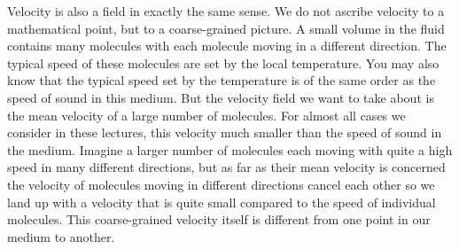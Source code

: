 Velocity is also a field in exactly the same sense. We do not ascribe velocity to a
mathematical point, but to a coarse-grained picture. A small volume in
the fluid contains many molecules with each molecule moving in a different direction.
 The typical speed of these molecules are set by the local temperature.
You may also know that the typical speed set by the temperature is of the
same order as the speed of sound in this medium. 
But the velocity field we want to take about is the mean velocity of a 
large number of molecules. 
For almost all cases we consider in these lectures, 
this velocity much smaller than the speed of sound in the medium. 
Imagine a larger number of molecules each moving with quite a high
speed in many different directions, but as far as their mean velocity is 
concerned the velocity of molecules moving in different directions cancel
each other so we land up with a velocity that is quite small compared to the
speed of individual molecules. This coarse-grained velocity itself is different
from one point in our medium to another. 

